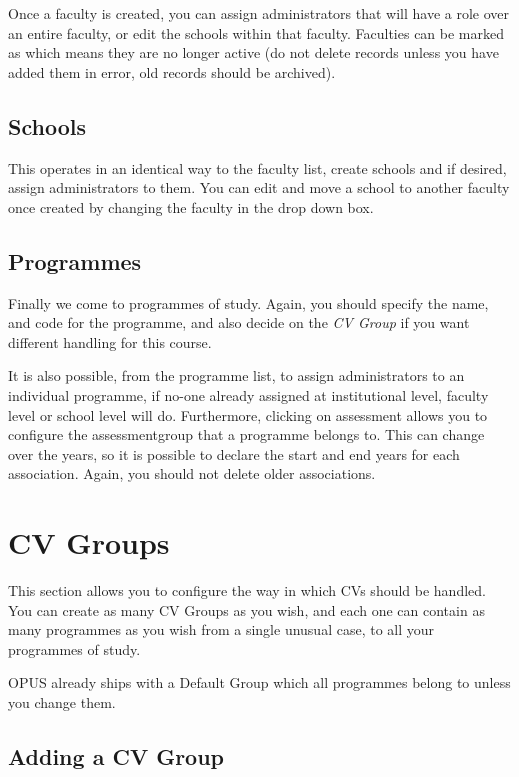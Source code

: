\documentclass[12 pt]{book}
\begin{document}
Once a faculty is created, you can assign administrators that will have a role
over an entire faculty, or edit the schools within that faculty. Faculties can
be marked as  which means they are no longer active (do not
delete records unless you have added them in error, old records should be
archived).

\subsection{Schools}

This operates in an identical way to the faculty list, create schools and if
desired, assign administrators to them. You can edit and move a school to
another faculty once created by changing the faculty in the drop down box.

\subsection{Programmes}

Finally we come to programmes of study. Again, you should specify the name, and
code for the programme, and also decide on the \emph{CV Group} if you want
different handling for this course.

It is also possible, from the programme list, to assign administrators to an
individual programme, if no-one already assigned at institutional level,
faculty level or school level will do. Furthermore, clicking on assessment
allows you to configure the assessmentgroup that a programme belongs to. This
can change over the years, so it is possible to declare the start and end years
for each association. Again, you should not delete older associations.

\section{CV Groups}

This section allows you to configure the way in which CVs should be handled.
You can create as many CV Groups as you wish, and each one can contain as many
programmes as you wish from a single unusual case, to all your programmes of
study.

OPUS already ships with a Default Group which all programmes belong to unless
you change them.

\subsection{Adding a CV Group}
\end{document}
